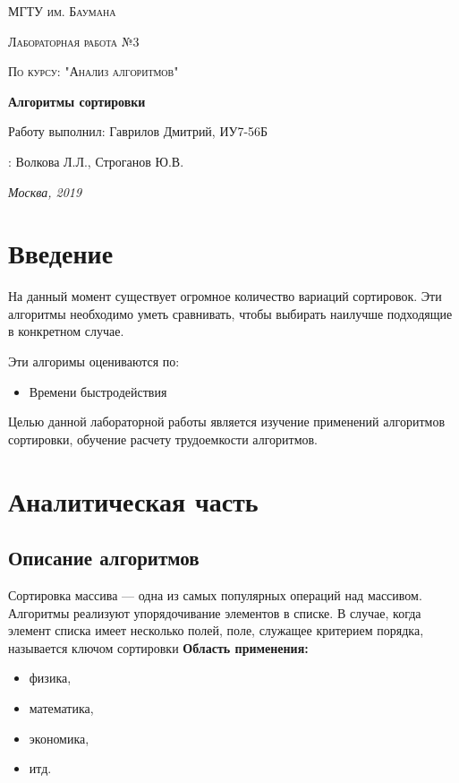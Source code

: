 \documentclass[12pt]{report}
\begin{document}
\begin{titlepage}
	\centering
	{\scshape\LARGE МГТУ им. Баумана \par}
	\vspace{3cm}
	{\scshape\Large Лабораторная работа №3\par}
	\vspace{0.5cm}	
	{\scshape\Large По курсу: "Анализ алгоритмов"\par}
	\vspace{1.5cm}
	{\huge\bfseries Алгоритмы сортировки\par}
	\vspace{2cm}
	\Large Работу выполнил: Гаврилов Дмитрий, ИУ7-56Б\par
	\vspace{0.5cm}
	:  Волкова Л.Л., Строганов Ю.В.\par

	\vfill
	\large \textit {Москва, 2019} \par
\end{titlepage}

\tableofcontents

\newpage
\chapter*{Введение}

На данный момент существует огромное количество вариаций сортировок.
Эти алгоритмы необходимо уметь сравнивать, чтобы выбирать наилучше подходящие в конкретном случае. 

Эти алгоримы оцениваются по:

\begin{itemize}
	\item Времени быстродействия
\end{itemize}

Целью данной лабораторной работы является изучение применений алгоритмов сортировки, обучение расчету трудоемкости алгоритмов.


\chapter{Аналитическая часть}
\section{Описание алгоритмов}
Сортировка массива — одна из самых популярных операций над массивом. Алгоритмы реализуют упорядочивание элементов в списке.
 В случае, когда элемент списка имеет несколько полей, поле, служащее критерием порядка, называется ключом сортировки
\textbf{Область применения:} 
\begin{itemize}
  	\item физика,
	\item математика,
	\item экономика,
	\item итд.
\end{itemize}
\end{document}
